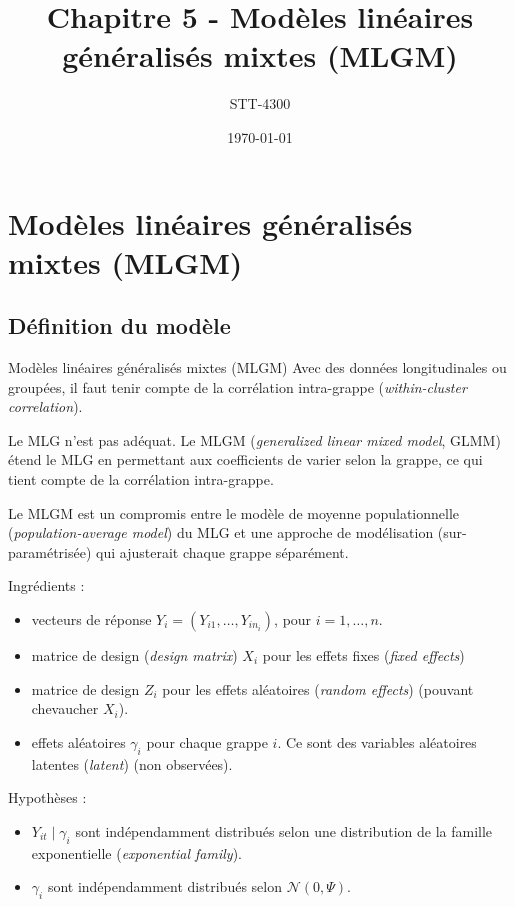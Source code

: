 \documentclass{BeamerTemplate}
\title{Chapitre 5 - Modèles linéaires généralisés mixtes (MLGM)}
\subtitle{STT-4300}
\date{\today}
\begin{document}
\begin{refsection}

\begin{frame}[t]
\titlepage
\end{frame}

\section{Modèles linéaires généralisés mixtes (MLGM)}
\label{GLMM.section}

\subsection{Définition du modèle}
\begin{frame}{Modèles linéaires généralisés mixtes (MLGM)}
Avec des données longitudinales ou groupées, il faut tenir compte de la
{\color{blue}corrélation intra-grappe} (\textit{within-cluster correlation}).

\bigskip

Le MLG n'est pas adéquat. Le {\color{blue}MLGM} (\textit{generalized linear mixed model}, GLMM) étend le MLG en permettant aux coefficients de varier selon la grappe, ce qui tient compte de la corrélation intra-grappe.

\bigskip
Le MLGM est un compromis entre le modèle de {\color{blue}moyenne populationnelle} (\textit{population-average model}) du MLG et une approche de modélisation (sur-pa\-ra\-mé\-tri\-sée) qui ajusterait chaque grappe séparément.
\end{frame}

\begin{frame}
Ingrédients :
\begin{itemize}
\item vecteurs de réponse $Y_i = (Y_{i1},\ldots,Y_{in_i})$, pour $i=1,\ldots,n$.
\item matrice de design (\textit{design matrix}) $X_i$ pour les {\color{blue}effets fixes} (\textit{fixed effects})
\item matrice de design $Z_i$ pour les {\color{blue}effets aléatoires} (\textit{random effects}) (pouvant chevaucher
$X_i$).
\item effets aléatoires $\gamma_i$ pour chaque grappe $i$. Ce sont des variables aléatoires {\color{blue}latentes} (\textit{latent}) (non observées).
\end{itemize}

\bigskip
Hypothèses :
\begin{itemize}
\item $Y_{it} \mid \gamma_i$ sont indépendamment distribués selon une
  distribution de la {\color{blue}famille exponentielle} (\textit{exponential family}).
\item $\gamma_i$ sont indépendamment distribués selon ${\mathcal
    N}(0, \Psi)$.
\end{itemize}


\end{frame}
\end{refsection}
\end{document}
